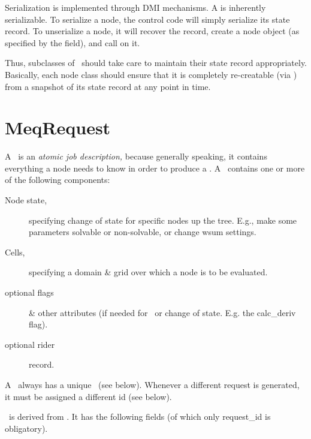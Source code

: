 \documentclass[10pt]{article}
\begin{document}
  Serialization is implemented through DMI mechanisms. A  is
  inherently serializable. To serialize a node, the control code will simply
  serialize its state record. To unserialize a node, it will recover the
  record, create a node object (as specified by the  field), and call
   on it. 

  Thus, subclasses of \Node\ should take care to maintain their state record
  appropriately. Basically, each node class should ensure that it is completely
  re-creatable (via ) from a snapshot of its state record at any
  point in time.

\section{MeqRequest}

  A \Request\ is an {\em atomic job description,} because generally speaking,
  it contains everything a node needs to know in order to produce a \Result. A
  \Request\ contains one or more of the following components:

  \begin{description}
  \item[Node state,] specifying change of state for specific nodes up the tree.
    E.g., make some parameters solvable or non-solvable, or change wsum
    settings. 

  \item[Cells,] specifying a domain \& grid over which a node is to be
    evaluated.

  \item[optional flags] \& other attributes (if needed for \Cells\ or change of
    state. E.g. the calc\_deriv flag).

  \item[optional rider] record.
  
  \end{description}
      
  A \Request\ always has a unique \RequestId\ (see below). Whenever a different
  request is generated, it must be assigned a different id (see below).

  \Request\ is derived from . It has the following fields (of
  which only request\_id is obligatory).
\end{document}
